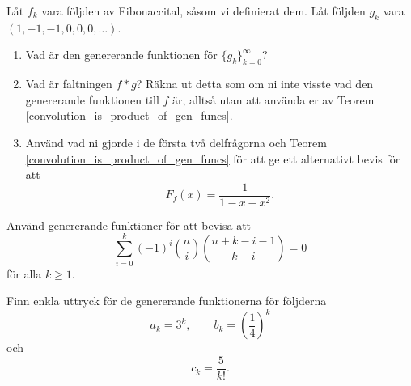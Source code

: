 \documentclass[nobib]{tufte-handout}
\begin{document}
\begin{xca}
    Låt $f_k$ vara följden av Fibonaccital, såsom vi definierat dem. Låt följden $g_k$ vara $(1, -1, -1, 0, 0, 0,\ldots)$.

    \begin{enumerate}
        \item Vad är den genererande funktionen för $\{g_k\}_{k=0}^\infty$?
        \item Vad är faltningen $f * g$? Räkna ut detta som om ni inte visste vad den genererande funktionen till $f$ är, alltså utan att använda er av Teorem \ref{convolution_is_product_of_gen_funcs}.
        \item Använd vad ni gjorde i de första två delfrågorna och Teorem \ref{convolution_is_product_of_gen_funcs} för att ge ett alternativt bevis för att
        $$F_f(x) = \frac{1}{1 - x - x^2}.$$
    \end{enumerate}
\end{xca}

\begin{xca}
    Använd genererande funktioner för att bevisa att
    $$\sum_{i=0}^{k} (-1)^i \binom{n}{i}\binom{n + k - i - 1}{k - i} = 0$$
    för alla $k \geq 1$.
\end{xca}

\begin{xca}
    Finn enkla uttryck för de genererande funktionerna för följderna
    $$a_k = 3^k, \qquad b_k = \left(\frac{1}{4}\right)^k$$
    och
    $$c_k = \frac{5}{k!}.$$
\end{xca}

%
%
\end{document}

